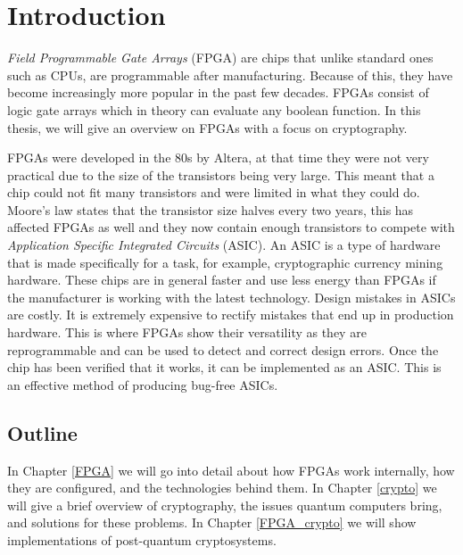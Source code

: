 \chapter{Introduction\label{intro}}

\textit{Field Programmable Gate Arrays} (FPGA) are chips that unlike standard
ones such as CPUs, are programmable after manufacturing. Because of this, they
have become increasingly more popular in the past few decades. FPGAs consist of
logic gate arrays which in theory can evaluate any boolean function. In this
thesis, we will give an overview on FPGAs with a focus on cryptography.

FPGAs were developed in the 80s by Altera, at that time they were not very
practical due to the size of the transistors being very large. This meant that
a chip could not fit many transistors and were limited in what they could do.
Moore's law states that the transistor size halves every two years, this has
affected FPGAs as well and they now contain enough transistors to compete with
\textit{Application Specific Integrated Circuits} (ASIC). An ASIC is a type of
hardware that is made specifically for a task, for example, cryptographic
currency mining hardware. These chips are in general faster and use less energy
than FPGAs if the manufacturer is working with the latest technology. Design
mistakes in ASICs are
costly. It is extremely expensive to rectify mistakes that end up in production
hardware. This is where FPGAs show their versatility as they are
reprogrammable and can be used to detect and correct design errors. Once the
chip has been verified that it works, it can be implemented as an ASIC. This
is an effective method of producing bug-free ASICs.

\section{Outline\label{outline}}
In Chapter \ref{FPGA} we will go into detail about how FPGAs work internally,
how they are configured, and the technologies behind them. In Chapter \ref{crypto}
we will give a brief overview of cryptography, the issues quantum computers bring,
and solutions for these problems. In Chapter \ref{FPGA_crypto} we will show 
implementations of post-quantum cryptosystems.
